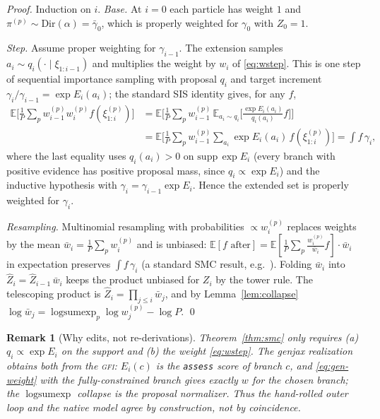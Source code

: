 \documentclass[11pt]{article}
\newcommand{\GFI}{\textsc{gfi}}
\newcommand{\given}{\mid}
\newcommand{\lse}{\operatorname{logsumexp}}
\newcommand{\Dir}{\mathrm{Dir}}
\newcommand{\code}[1]{\texttt{#1}}
\newtheorem{remark}{Remark}
\begin{document}
\begin{proof}
Induction on $i$. \emph{Base.} At $i=0$ each particle has weight $1$ and $\pi^{(p)}\sim\Dir(\alpha)=\bar\gamma_0$, which is properly weighted for $\gamma_0$ with $Z_0=1$.

\emph{Step.} Assume proper weighting for $\gamma_{i-1}$. The extension samples $a_i \sim q_i(\cdot\given\xi_{1:i-1})$ and multiplies the weight by $w_i$ of \eqref{eq:wstep}. This is one step of sequential importance sampling with proposal $q_i$ and target increment $\gamma_i/\gamma_{i-1} = \exp E_i(a_i)$; the standard SIS identity gives, for any $f$,
\begin{align*}
  \mathbb{E}\Big[\tfrac1P\!\sum_p w_{i-1}^{(p)} w_i^{(p)} f(\xi_{1:i}^{(p)})\Big]
  &= \mathbb{E}\Big[\tfrac1P\!\sum_p w_{i-1}^{(p)} \,\mathbb{E}_{a_i\sim q_i}\!\Big[\tfrac{\exp E_i(a_i)}{q_i(a_i)} f\Big]\Big]\\
  &= \mathbb{E}\Big[\tfrac1P\!\sum_p w_{i-1}^{(p)} \!\!\sum_{a_i}\!\exp E_i(a_i)\, f(\xi_{1:i}^{(p)})\Big]
   = \textstyle\int f\,\gamma_i,
\end{align*}
where the last equality uses $q_i(a_i)>0$ on $\mathrm{supp}\,\exp E_i$ (every branch with positive
evidence has positive proposal mass, since $q_i\propto \exp E_i$) and the inductive hypothesis with
$\gamma_i = \gamma_{i-1}\exp E_i$. Hence the extended set is properly weighted for $\gamma_i$.

\emph{Resampling.} Multinomial resampling with probabilities $\propto w_i^{(p)}$ replaces weights by
the mean $\bar w_i = \tfrac1P\sum_p w_i^{(p)}$ and is unbiased: $\mathbb{E}[f \text{ after}] =
\mathbb{E}[\tfrac1P\sum_p \tfrac{w_i^{(p)}}{\bar w_i} f]\cdot \bar w_i$ in expectation preserves
$\int f\,\gamma_i$ (a standard SMC result, e.g.\ \cite{chopin2020}). Folding $\bar w_i$ into
$\widehat Z_i = \widehat Z_{i-1}\,\bar w_i$ keeps the product unbiased for $Z_i$ by the tower rule.
The telescoping product is $\widehat Z_i = \prod_{j\le i}\bar w_j$, and by Lemma~\ref{lem:collapse}
$\log \bar w_j = \lse_p \log w_j^{(p)} - \log P$. \qed
\end{proof}

\begin{remark}[Why edits, not re-derivations]
Theorem~\ref{thm:smc} only requires (a) $q_i\propto\exp E_i$ on the support and (b) the weight
\eqref{eq:wstep}. The genjax realization obtains both from the \GFI: $E_i(c)$ is the \code{assess}
score of branch $c$, and \eqref{eq:gen-weight} with the fully-constrained branch gives exactly
$w$ for the chosen branch; the $\lse$ collapse is the proposal normalizer. Thus the hand-rolled
outer loop and the native model agree by construction, not by coincidence.
\end{remark}
\end{document}
